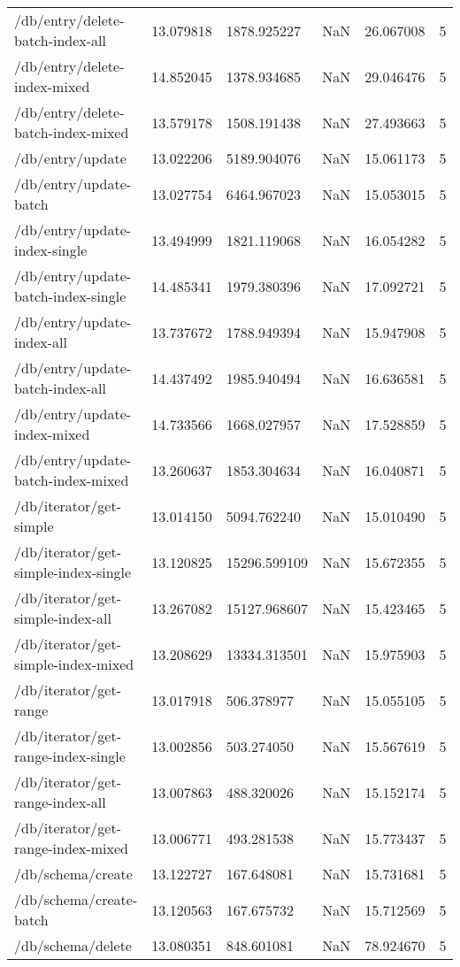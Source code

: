 \begin{tabularx}{\linewidth}{XXXXXX}
/db/entry/delete-batch-index-all & 13.079818 & 1878.925227 & NaN & 26.067008 & 5 \\
/db/entry/delete-index-mixed & 14.852045 & 1378.934685 & NaN & 29.046476 & 5 \\
/db/entry/delete-batch-index-mixed & 13.579178 & 1508.191438 & NaN & 27.493663 & 5 \\
/db/entry/update & 13.022206 & 5189.904076 & NaN & 15.061173 & 5 \\
/db/entry/update-batch & 13.027754 & 6464.967023 & NaN & 15.053015 & 5 \\
/db/entry/update-index-single & 13.494999 & 1821.119068 & NaN & 16.054282 & 5 \\
/db/entry/update-batch-index-single & 14.485341 & 1979.380396 & NaN & 17.092721 & 5 \\
/db/entry/update-index-all & 13.737672 & 1788.949394 & NaN & 15.947908 & 5 \\
/db/entry/update-batch-index-all & 14.437492 & 1985.940494 & NaN & 16.636581 & 5 \\
/db/entry/update-index-mixed & 14.733566 & 1668.027957 & NaN & 17.528859 & 5 \\
/db/entry/update-batch-index-mixed & 13.260637 & 1853.304634 & NaN & 16.040871 & 5 \\
/db/iterator/get-simple & 13.014150 & 5094.762240 & NaN & 15.010490 & 5 \\
/db/iterator/get-simple-index-single & 13.120825 & 15296.599109 & NaN & 15.672355 & 5 \\
/db/iterator/get-simple-index-all & 13.267082 & 15127.968607 & NaN & 15.423465 & 5 \\
/db/iterator/get-simple-index-mixed & 13.208629 & 13334.313501 & NaN & 15.975903 & 5 \\
/db/iterator/get-range & 13.017918 & 506.378977 & NaN & 15.055105 & 5 \\
/db/iterator/get-range-index-single & 13.002856 & 503.274050 & NaN & 15.567619 & 5 \\
/db/iterator/get-range-index-all & 13.007863 & 488.320026 & NaN & 15.152174 & 5 \\
/db/iterator/get-range-index-mixed & 13.006771 & 493.281538 & NaN & 15.773437 & 5 \\
/db/schema/create & 13.122727 & 167.648081 & NaN & 15.731681 & 5 \\
/db/schema/create-batch & 13.120563 & 167.675732 & NaN & 15.712569 & 5 \\
/db/schema/delete & 13.080351 & 848.601081 & NaN & 78.924670 & 5 \\

\end{tabularx}
